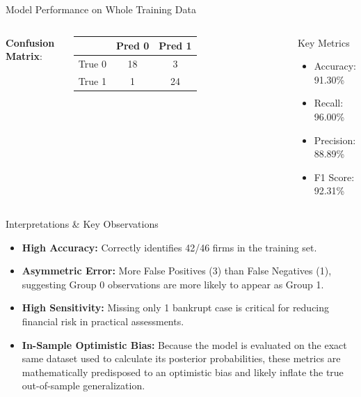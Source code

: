 \documentclass[8pt, aspectratio=169]{beamer}
\begin{document}
\begin{frame}{Model Performance on Whole Training Data}
    \begin{columns}
        \textbf{Confusion Matrix}:
        \begin{table}
            \centering
            \small
            \begin{tabular}{lcc}
                \toprule
                 & Pred 0 & Pred 1 \\
                \midrule
                True 0 & 18 & 3 \\
                True 1 & 1 & 24 \\
                \bottomrule
            \end{tabular}
        \end{table}
        
        \begin{exampleblock}{Key Metrics}
            \small
            \begin{itemize}
                \item Accuracy: 91.30\%
                \item Recall: 96.00\%
                \item Precision: 88.89\%
                \item F1 Score: 92.31\%
            \end{itemize}
        \end{exampleblock}
    \end{columns}
    
    \vspace{0.2cm}
    
    \begin{alertblock}{Interpretations \& Key Observations}
        \footnotesize
        \begin{itemize}
            \item \textbf{High Accuracy:} Correctly identifies 42/46 firms in the training set.
            \item \textbf{Asymmetric Error:} More False Positives (3) than False Negatives (1), suggesting Group 0 observations are more likely to appear as Group 1.
            \item \textbf{High Sensitivity:} Missing only 1 bankrupt case is critical for reducing financial risk in practical assessments.
            \item \textbf{In-Sample Optimistic Bias:} Because the model is evaluated on the exact same dataset used to calculate its posterior probabilities, these metrics are mathematically predisposed to an optimistic bias and likely inflate the true out-of-sample generalization. 
        \end{itemize}
    \end{alertblock}
\end{frame}
\end{document}
